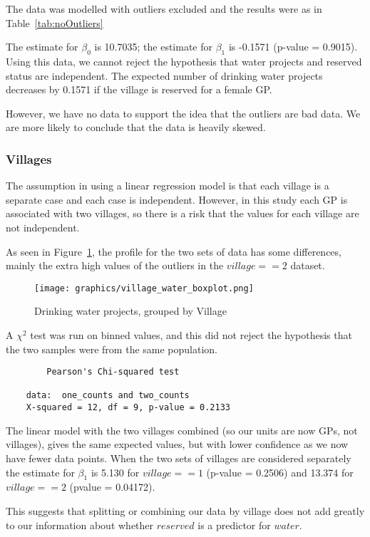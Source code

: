 \documentclass[12pt,letterpaper]{article}
\begin{document}
  The data was modelled with outliers excluded and the results were as in 
  Table~\ref{tab:noOutliers}
  
  The estimate for $\beta_0$ is 10.7035; the estimate for $\beta_1$ is -0.1571
  (p-value = 0.9015).  Using this data, we cannot reject the hypothesis that 
  water projects and reserved status are independent.  The expected number of 
  drinking water projects decreases by 0.1571 if the village is reserved for a 
  female GP.
  
  However, we have no data to support the idea that the outliers are bad data.  
  We are more likely to conclude that the data is heavily skewed.

  
  
  \subsubsection*{Villages}
  
  The assumption in using a linear regression model is that each village is a 
  separate case and each case is independent.  However, in this study 
  each GP is associated with two villages, so there is a risk that the values for 
  each village are not independent.
  
  As seen in Figure~\ref{fig:village_boxplot}, the profile for the two sets of data 
  has some differences, mainly the extra high values of the outliers in the 
  $village == 2$ dataset.
  
  \begin{figure}[htb!]
	  \caption{\footnotesize{Drinking water projects, grouped by Village}}
	  \vspace{.5cm}
	  \centering
	  \label{fig:village_boxplot}
	  \texttt{[image: graphics/village\_water\_boxplot.png]}
  \end{figure}		
	
  A $\chi^2$ test was run on binned values, and this did not reject the hypothesis
  that the two samples were from the same population.
  
  \begin{verbatim}
    	Pearson's Chi-squared test

    data:  one_counts and two_counts
    X-squared = 12, df = 9, p-value = 0.2133
  \end{verbatim}
  
  The linear model with the two villages combined (so our units are now GPs, not 
  villages), gives the same expected values, but with lower confidence as we now 
  have fewer data points.  When the two sets of villages are considered separately
  the estimate for $\beta_1$ is 5.130 for $village==1$ (p-value = 0.2506) and 
  13.374 for $village==2$ (pvalue = 0.04172).
  
  This suggests that splitting or combining our data by village does not add greatly
  to our information about whether $reserved$ is a predictor for $water$. 

  
  
  
\newpage
{}
	  
\end{document}
